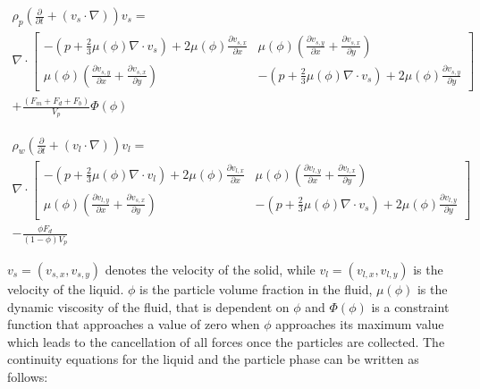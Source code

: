 \begin{multline} 
\rho_{p}\left(\frac{\partial}{\partial t}+(v_{s}\cdotp\nabla)\right)v_{s} = \\ \nabla\cdotp \begin{bmatrix} -\left(p+\frac{2}{3}\mu(\phi)\nabla\cdotp v_{s}\right)+2\mu(\phi)\frac{\partial v_{s,x}}{\partial x} & \mu(\phi)\left(\frac{\partial v_{s,y}}{\partial x}+\frac{\partial v_{s,x}}{\partial y}\right) \\ \mu(\phi)\left(\frac{\partial v_{s,y}}{\partial x}+\frac{\partial v_{s,x}}{\partial y}\right)  &  -\left(p+\frac{2}{3}\mu(\phi)\nabla\cdotp v_{s}\right)+2\mu(\phi)\frac{\partial v_{s,y}}{\partial y}\end{bmatrix}\\ + \frac{(F_{m}+F_{d}+F_{b})}{V_{p}}\Phi(\phi)
\label{eq:NS_part1}
\end{multline}

\begin{multline} 
\rho_{w}\left(\frac{\partial}{\partial t}+(v_{l}\cdotp\nabla)\right)v_{l} = \\ \nabla\cdotp \begin{bmatrix} -\left(p+\frac{2}{3}\mu(\phi)\nabla\cdotp v_{l}\right)+2\mu(\phi)\frac{\partial v_{l,x}}{\partial x} & \mu(\phi)\left(\frac{\partial v_{l,y}}{\partial x}+\frac{\partial v_{l,x}}{\partial y}\right) \\ \mu(\phi)\left(\frac{\partial v_{l,y}}{\partial x}+\frac{\partial v_{s,x}}{\partial y}\right)  &  -\left(p+\frac{2}{3}\mu(\phi)\nabla\cdotp v_{s}\right)+2\mu(\phi)\frac{\partial v_{l,y}}{\partial y}\end{bmatrix}\\ - \frac{\phi F_{d}}{(1-\phi)V_{p}}
\label{eq:NS_part2}
\end{multline}

$v_{s}=(v_{s,x},v_{s,y})$ denotes the velocity of the solid, while  $v_{l}=(v_{l,x},v_{l,y})$ is the velocity of the liquid. $\phi$ is the particle volume fraction in the fluid, $\mu(\phi)$ is the dynamic viscosity of the fluid, that is dependent on $\phi$ and $\Phi(\phi)$ is a constraint function that approaches a value of zero when $\phi$ approaches its maximum value which leads to the cancellation of all forces once the particles are collected. The continuity equations for the liquid and the particle phase can be written as follows:  

